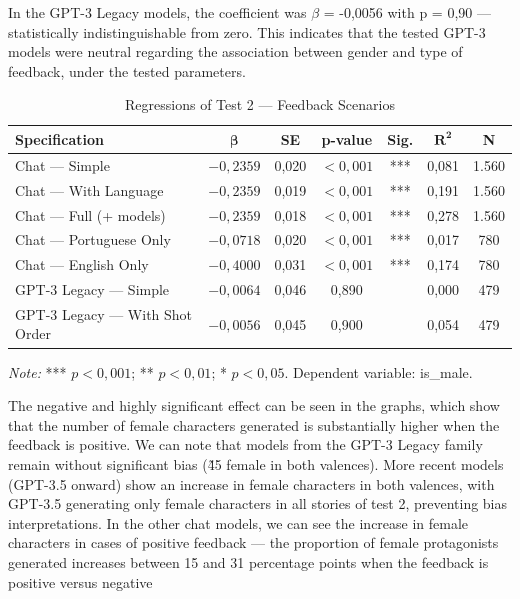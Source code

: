 \documentclass[jair,11pt,letterpaper]{article}
\begin{document}
In the GPT-3 Legacy models, the coefficient was $\beta$ = -0,0056 with p = 0,90 ---
statistically indistinguishable from zero. This indicates that the tested
GPT-3 models were neutral regarding the association between gender and type of
feedback, under the tested parameters.

\begin{table}[H]
\centering
\begin{tabular}{lcccccc}
\toprule
\textbf{Specification} & $\boldsymbol{\beta}$ & \textbf{SE} & \textbf{p-value} & \textbf{Sig.} & $\boldsymbol{R^2}$ & \textbf{N} \\
\midrule
Chat --- Simple & $-0,2359$ & 0,020 & $<0,001$ & *** & 0,081 & 1.560 \\
Chat --- With Language & $-0,2359$ & 0,019 & $<0,001$ & *** & 0,191 & 1.560 \\
Chat --- Full (+ models) & $-0,2359$ & 0,018 & $<0,001$ & *** & 0,278 & 1.560 \\
Chat --- Portuguese Only & $-0,0718$ & 0,020 & $<0,001$ & *** & 0,017 & 780 \\
Chat --- English Only & $-0,4000$ & 0,031 & $<0,001$ & *** & 0,174 & 780 \\
GPT-3 Legacy --- Simple & $-0,0064$ & 0,046 & 0,890 & & 0,000 & 479 \\
GPT-3 Legacy --- With Shot Order & $-0,0056$ & 0,045 & 0,900 & & 0,054 & 479 \\
\bottomrule
\end{tabular}

\smallskip
\footnotesize\textit{Note:} *** $p < 0,001$; ** $p < 0,01$; * $p < 0,05$. Dependent variable: is\_male.
\caption{Regressions of Test 2 --- Feedback Scenarios}
\label{tab:reg-teste2}
\end{table}

The negative and highly significant effect can be seen in the graphs,
which show that the number of female characters generated is
substantially higher when the feedback is positive. We can note that
models from the GPT-3 Legacy family remain without significant bias (\~45%
female in both valences). More recent models (GPT-3.5 onward) show an increase in female characters in both
valences, with GPT-3.5 generating only female characters in all
stories of test 2, preventing bias interpretations. In the other
chat models, we can see the increase in female characters in cases
of positive feedback --- the proportion of female protagonists generated
increases between 15 and 31 percentage points when the feedback is positive
versus negative
\end{document}

